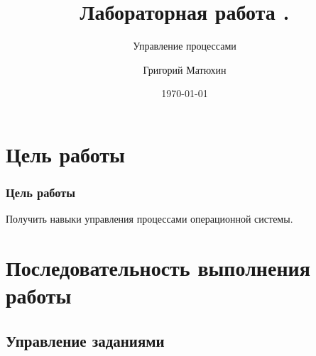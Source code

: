 \documentclass{beamer}
\author{Григорий Матюхин}
\date{\today}
\title{Лабораторная работа \textnumero6.}
\subtitle{Управление процессами}
\begin{document}
\begin{frame}[plain]
	\titlepage
\end{frame}
\section{Цель работы}
\begin{frame}[plain]
	\frametitle{Цель работы}
	Получить навыки управления процессами операционной системы.
\end{frame}

\section{Последовательность выполнения работы}
\subsection{Управление заданиями}
\end{document}
